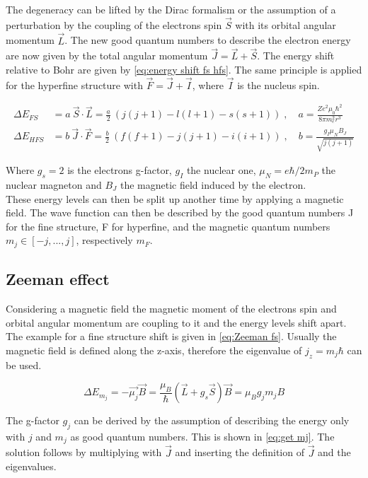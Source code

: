 \documentclass[]{article}
\begin{document}
The degeneracy can be lifted by the Dirac formalism or the assumption of a perturbation by the coupling of the electrons spin $\vec{S}$ with its orbital angular momentum $\vec{L}$. The new good quantum numbers to describe the electron energy are now given by the total angular momentum $\vec{J}=\vec{L}+\vec{S}$. 
The energy shift relative to Bohr are given by \autoref{eq:energy shift fs hfs}. The same principle is applied for the hyperfine structure with $\vec{F}=\vec{J}+\vec{I}$, where  $\vec{I}$ is the nucleus spin.

\begin{align}
\Delta E_{FS}&= a\ \vec{S}\cdot\vec{L} = \frac{a}{2}\ (j(j+1)-l(l+1)-s(s+1)) \;,\quad a=  \frac{Ze^2\mu_0\hbar^2}{8\pi m_e^2r^3}\\
\Delta E_{HFS}&= b\ \vec{J}\cdot\vec{F} = \frac{b}{2}\ (f(f+1)-j(j+1)-i(i+1))\;,\quad b= \frac{g_I\mu_NB_J}{\sqrt{j(j+1)}}
\label{eq:energy shift fs hfs}
\end{align}

Where $g_s=2$ is the electrons g-factor, $g_I$ the nuclear one, $\mu_N=e\hbar/2m_P$ the nuclear magneton and $B_J$ the magnetic field induced by the electron.\\

These energy levels can then be split up another time by applying a magnetic field. The wave function can then be described by the good quantum numbers J for the fine structure, F for hyperfine, and the magnetic quantum numbers $m_j \in [-j,...,j]$, respectively $m_F$.

\newpage
\subsection{Zeeman effect}
Considering a magnetic field the magnetic moment of the electrons spin and orbital angular momentum are coupling to it and the energy levels shift apart. The example for a fine structure shift is given in \autoref{eq:Zeeman fs}. Usually the magnetic field is defined along the z-axis, therefore the eigenvalue of $j_z=m_j \hbar$ can be used.

\begin{equation}
\Delta E_{m_j} = -\vec{\mu_j}\vec{B} = \frac{\mu_B}{\hbar}(\vec{L}+g_s\vec{S})\vec{B} = \mu_B g_j m_j B 
\label{eq:Zeeman fs}
\end{equation}

The g-factor $g_j$ can be derived by the assumption of describing the energy only with $j$ and $m_j$ as good quantum numbers. This is shown in \autoref{eq:get mj}. The solution follows by multiplying with $\vec{J}$ and inserting the definition of $\vec{J}$ and the eigenvalues.
\end{document}
